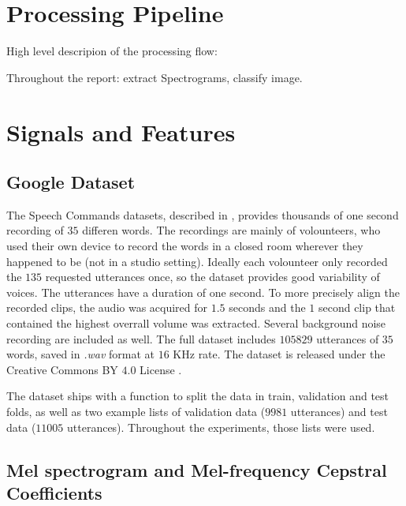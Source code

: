 
\section{Processing Pipeline}
\label{sec:processing_architecture}

High level descripion of the processing flow:

Throughout the report: extract Spectrograms, classify image.

\section{Signals and Features}
\label{sec:model}

\subsection{Google Dataset}


The Speech Commands datasets, described in \cite{warden2018speech}, provides
thousands of one second recording of $35$ differen words. The recordings are
mainly of volounteers, who used their own device to record the words in a
closed room wherever they happened to be (not in a studio setting).
Ideally each volounteer only recorded the $135$ requested utterances once, so the
dataset provides good variability of voices.
The utterances have a duration of one second.
To more precisely align the recorded clips, the audio was acquired for $1.5$
seconds and the $1$ second clip that contained the highest overrall volume was
extracted.
Several background noise recording are included as well.
The full dataset includes $105829$ utterances of $35$ words, saved in
\textit{.wav} format at $16$ KHz rate.
The dataset is released under the Creative Commons BY $4.0$ License \cite{ccby4}.

The dataset ships with a function to split the data in train, validation and
test folds, as well as two example lists of validation data ($9981$ utterances)
and test data ($11005$ utterances).
Throughout the experiments, those lists were used.

\subsection{Mel spectrogram and Mel-frequency Cepstral Coefficients}

